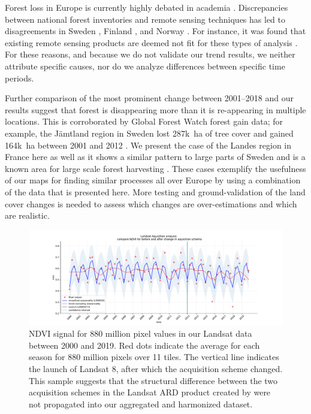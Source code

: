 Forest loss in Europe is currently highly debated in academia \citep{senf2018canopy,ceccherini2020abrupt,senf2021mapping, palahi2021concerns, picard2021recent}. Discrepancies between national forest inventories and remote sensing techniques has led to disagreements in Sweden \citep{paulsson2020incorrect}, Finland \citep{korhonen2020new}, and Norway \citep{rossi2019assessing}. For instance, it was found that existing remote sensing products are deemed not fit for these types of analysis \citep{palahi2021concerns}. For these reasons, and because we do not validate our trend results, we neither attribute specific causes, nor do we analyze differences between specific time periods. 
    
Further comparison of the most prominent change between 2001--2018 and our results suggest that forest is disappearing more than it is re-appearing in multiple locations. This is corroborated by Global Forest Watch forest gain data; for example, the J\"{a}mtland region in Sweden lost 287k~ha of tree cover and gained 164k~ha between 2001 and 2012 \citep{hansen2013high}. We present the case of the Landes region in France here as well as it shows a similar pattern to large parts of Sweden and is a known area for large scale forest harvesting \citep{senf2021mapping}. These cases exemplify the usefulness of our maps for finding similar processes all over Europe by using a combination of the data that is presented here. More testing and ground-validation of the land cover changes is needed to assess which changes are over-estimations and which are realistic.
    
\begin{figure}[!hbt]
\centering
\hspace*{-1.5cm}
\includegraphics[width=1\textwidth]{figs_03/discussion_landsat_acquisition.pdf}
\caption{NDVI signal for 880 million pixel values in our Landsat data between 2000 and 2019. Red dots indicate the average for each season for 880 million pixels over 11 tiles. The vertical line indicates the launch of Landsat 8, after which the acquisition scheme changed. This sample suggests that the structural difference between the two acquisition schemes in the Landsat ARD product created by \citet{potapov2020landsat} were not propagated into our aggregated and harmonized dataset.} \label{fig:landsat_acquisition_vs_ndvi}
\end{figure}
        
